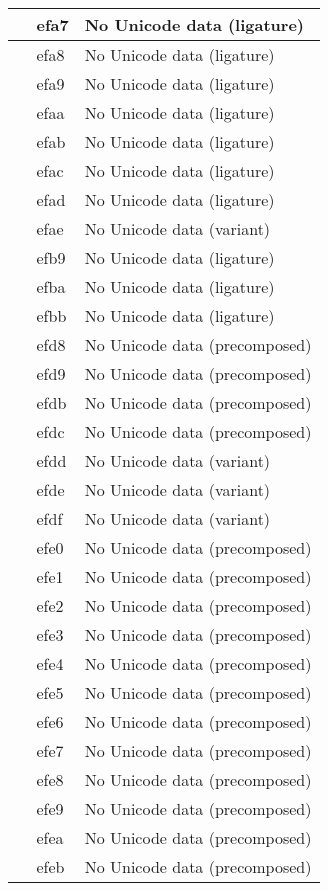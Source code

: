 \documentclass[12pt,letterpaper,openany]{book}
\begin{document}
\begin{center}
\begin{supertabular}{|m{0.25in}|m{0.5in}|m{4in}|}
 & efa7 & No Unicode data (ligature)\\\hline
 & efa8 & No Unicode data (ligature)\\\hline
 & efa9 & No Unicode data (ligature)\\\hline
 & efaa & No Unicode data (ligature)\\\hline
 & efab & No Unicode data (ligature)\\\hline
 & efac & No Unicode data (ligature)\\\hline
 & efad & No Unicode data (ligature)\\\hline
 & efae & No Unicode data (variant)\\\hline
 & efb9 & No Unicode data (ligature)\\\hline
 & efba & No Unicode data (ligature)\\\hline
 & efbb & No Unicode data (ligature)\\\hline
 & efd8 & No Unicode data (precomposed)\\\hline
 & efd9 & No Unicode data (precomposed)\\\hline
 & efdb & No Unicode data (precomposed)\\\hline
 & efdc & No Unicode data (precomposed)\\\hline
 & efdd & No Unicode data (variant)\\\hline
 & efde & No Unicode data (variant)\\\hline
 & efdf & No Unicode data (variant)\\\hline
 & efe0 & No Unicode data (precomposed)\\\hline
 & efe1 & No Unicode data (precomposed)\\\hline
 & efe2 & No Unicode data (precomposed)\\\hline
 & efe3 & No Unicode data (precomposed)\\\hline
 & efe4 & No Unicode data (precomposed)\\\hline
 & efe5 & No Unicode data (precomposed)\\\hline
 & efe6 & No Unicode data (precomposed)\\\hline
 & efe7 & No Unicode data (precomposed)\\\hline
 & efe8 & No Unicode data (precomposed)\\\hline
 & efe9 & No Unicode data (precomposed)\\\hline
 & efea & No Unicode data (precomposed)\\\hline
 & efeb & No Unicode data (precomposed)\\\hline

\end{supertabular}
\end{center}
\end{document}
